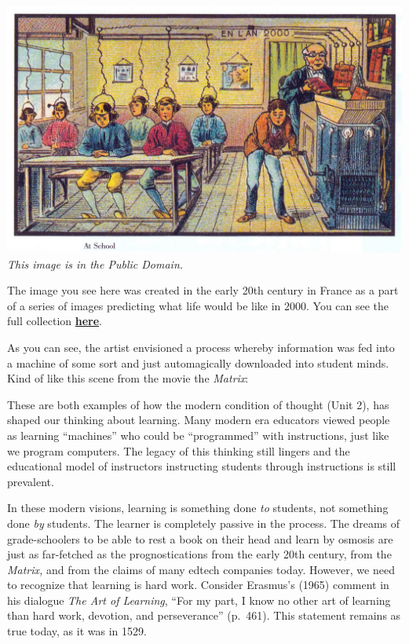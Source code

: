 \documentclass[
]{book}
\begin{document}
\includegraphics{assets/u4/France_in_XXI_Century._School.jpg}
\emph{This image is in the Public Domain.}

The image you see here was created in the early 20th century in France as a part of a series of images predicting what life would be like in 2000. You can see the full collection \href{https://publicdomainreview.org/collections/france-in-the-year-2000-1899-1910/}{\textbf{here}}.

As you can see, the artist envisioned a process whereby information was fed into a machine of some sort and just automagically downloaded into student minds. Kind of like this scene from the movie the \emph{Matrix}:

These are both examples of how the modern condition of thought (Unit 2), has shaped our thinking about learning. Many modern era educators viewed people as learning ``machines'' who could be ``programmed'' with instructions, just like we program computers. The legacy of this thinking still lingers and the educational model of instructors instructing students through instructions is still prevalent.

In these modern visions, learning is something done \emph{to} students, not something done \emph{by} students. The learner is completely passive in the process. The dreams of grade-schoolers to be able to rest a book on their head and learn by osmosis are just as far-fetched as the prognostications from the early 20th century, from the \emph{Matrix,} and from the claims of many edtech companies today. However, we need to recognize that learning is hard work. Consider Erasmus's (1965) comment in his dialogue \emph{The Art of Learning}, ``For my part, I know no other art of learning than hard work, devotion, and perseverance'' (p.~461). This statement remains as true today, as it was in 1529.
\end{document}
